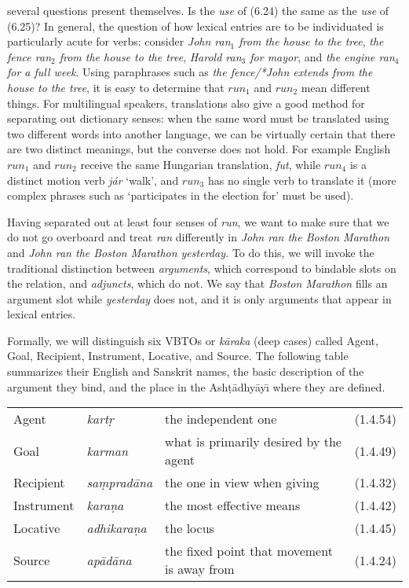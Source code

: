 \smallskip\noindent several questions present themselves. Is the {\it use} of
(6.24) the same as the {\it use} of (6.25)? In general, the question of how
lexical entries are to be individuated is particularly acute for verbs:
consider {\it John ran$_1$ from the house to the tree}, {\it the fence ran$_2$
  from the house to the tree}, {\it Harold ran$_3$ for mayor}, and {\it the
  engine ran$_4$ for a full week}. Using paraphrases such as {\it the
  fence/*John extends from the house to the tree}, it is easy to determine
that $run_1$ and $run_2$ mean different things. For multilingual speakers,
translations also give a good method for separating out dictionary senses:
when the same word must be translated using two different words into another
language, we can be virtually certain that there are two distinct meanings,
but the converse does not hold. For example English $run_1$ and $run_2$
receive the same Hungarian translation, {\it fut}, while $run_4$ is a distinct
motion verb {\it j\'ar} `walk', and $run_3$ has no single verb to translate it
(more complex phrases such as `participates in the election for' must be
used).

Having separated out at least four senses of {\it run}, we want to make sure
that we do not go overboard and treat {\it ran} differently in {\it John ran
  the Boston Marathon} and {\it John ran the Boston Marathon yesterday.} To do
this, we will invoke the traditional distinction between {\it arguments},
which correspond to bindable slots on the relation, and {\it adjuncts}, which
do not. We say that {\it Boston Marathon} fills
an argument slot while {\it yesterday} does not, and it is only arguments that
appear in lexical entries.

Formally, we will distinguish six VBTOs or {\it k\={a}raka} (deep
cases) called Agent, Goal, Recipient,
Instrument, Locative, and Source. The following table summarizes their English
and Sanskrit names, the basic description of the argument they bind, and the
place in the Ash\d{t}\={a}dhy\={a}y\={\i} where they are defined.

\bigskip\noindent
\begin{tabular}{llll}
Agent & {\it kart\d{r}} & the independent one & (1.4.54)\\
Goal & {\it karman} & what is primarily desired by the agent & (1.4.49)\\
Recipient & {\it sa\d{m}prad\={a}na} & the one in view when giving & (1.4.32)\\
Instrument & {\it kara\d{n}a} & the most effective means & (1.4.42)\\
Locative & {\it adhikara\d{n}a} & the locus & (1.4.45)\\
Source & {\it ap\={a}d\={a}na} & the fixed point that movement is away from
  & (1.4.24)\\
\end{tabular}

